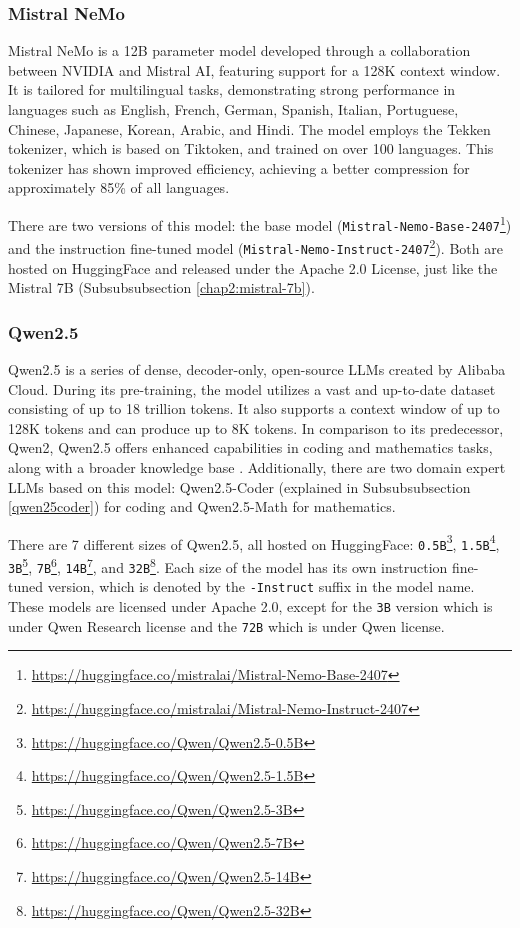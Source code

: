 \subsubsection{Mistral NeMo}
Mistral NeMo \citep{mistralnemo} is a 12B parameter model developed through a collaboration between NVIDIA and Mistral AI, featuring support for a 128K context window. It is tailored for multilingual tasks, demonstrating strong performance in languages such as English, French, German, Spanish, Italian, Portuguese, Chinese, Japanese, Korean, Arabic, and Hindi. The model employs the Tekken tokenizer, which is based on Tiktoken, and trained on over 100 languages. This tokenizer has shown improved efficiency, achieving a better compression for approximately 85\% of all languages.

There are two versions of this model: the base model (\texttt{Mistral-Nemo-Base-2407}\footnote{\url{https://huggingface.co/mistralai/Mistral-Nemo-Base-2407}}) and the instruction fine-tuned model (\texttt{Mistral-Nemo-Instruct-2407}\footnote{\url{https://huggingface.co/mistralai/Mistral-Nemo-Instruct-2407}}). Both are hosted on HuggingFace and released under the Apache 2.0 License, just like the Mistral 7B (Subsubsubsection \ref{chap2:mistral-7b}).

\subsubsection{Qwen2.5}
Qwen2.5 is a series of dense, decoder-only, open-source LLMs created by Alibaba Cloud. During its pre-training, the model utilizes a vast and up-to-date dataset consisting of up to 18 trillion tokens. It also supports a context window of up to 128K tokens and can produce up to 8K tokens. In comparison to its predecessor, Qwen2, Qwen2.5 offers enhanced capabilities in coding and mathematics tasks, along with a broader knowledge base \citep{qwen25}. Additionally, there are two domain expert LLMs based on this model: Qwen2.5-Coder (explained in Subsubsubsection \ref{qwen25coder}) for coding and Qwen2.5-Math for mathematics.

There are 7 different sizes of Qwen2.5, all hosted on HuggingFace: \texttt{0.5B}\footnote{\url{https://huggingface.co/Qwen/Qwen2.5-0.5B}}, \texttt{1.5B}\footnote{\url{https://huggingface.co/Qwen/Qwen2.5-1.5B}}, \texttt{3B}\footnote{\url{https://huggingface.co/Qwen/Qwen2.5-3B}}, \texttt{7B}\footnote{\url{https://huggingface.co/Qwen/Qwen2.5-7B}}, \texttt{14B}\footnote{\url{https://huggingface.co/Qwen/Qwen2.5-14B}}, and \texttt{32B}\footnote{\url{https://huggingface.co/Qwen/Qwen2.5-32B}}. Each size of the model has its own instruction fine-tuned version, which is denoted by the \texttt{-Instruct} suffix in the model name. These models are licensed under Apache 2.0, except for the \texttt{3B} version which is under Qwen Research license and the \texttt{72B} which is under Qwen license.

